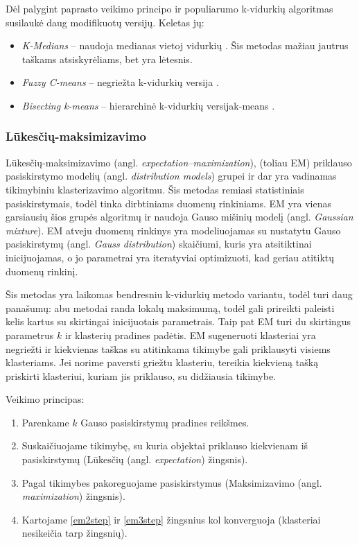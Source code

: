 \documentclass{VUMIFInfKursinis}
\newcommand{\ltang}[2]{#1 (angl. \textit{#2})}
\begin{document}

Dėl palygint paprasto veikimo principo ir populiarumo k-vidurkių
algoritmas susilaukė daug modifikuotų versijų. Keletas jų:

\begin{itemize}

\item
  \textit{K-Medians} – naudoja medianas vietoj vidurkių \cite{jain1988algorithms}. Šis metodas
  mažiau jautrus taškams atsiskyrėliams, bet yra lėtesnis.
\item
  \textit{Fuzzy C-means} – negriežta k-vidurkių versija \cite{dunn1973fuzzy}.
\item
  \textit{Bisecting k-means} – hierarchinė k-vidurkių versijak-means \cite{steinbach2000comparison} .
\end{itemize}






\subsubsection{Lūkesčių-maksimizavimo}

\ltang{Lūkesčių-maksimizavimo}{expectation–maximization},
(toliau EM) priklauso
\ltang{pasiskirstymo modelių}{distribution models}   grupei
ir dar yra vadinamas tikimybiniu klasterizavimo algoritmu.
Šis metodas
remiasi statistiniais pasiskirstymais,
todėl tinka dirbtiniams duomenų rinkiniams.
EM yra vienas garsiausių šios grupės algoritmų \cite{wu2008top} ir naudoja \ltang{Gauso mišinių modelį}{Gaussian mixture}. EM atveju duomenų
rinkinys yra modeliuojamas su nustatytu \ltang{Gauso pasiskirstymų}{Gauss distribution}  
skaičiumi, kuris yra atsitiktinai inicijuojamas, o jo parametrai yra
iteratyviai optimizuoti, kad geriau atitiktų duomenų rinkinį.

Šis metodas yra laikomas bendresniu k-vidurkių metodo variantu, todėl
turi daug panašumų: abu metodai randa lokalų maksimumą, todėl gali
prireikti paleisti kelis kartus su skirtingai inicijuotais parametrais.
Taip pat EM turi du skirtingus parametrus $k$ ir klasterių pradines
padėtis. EM sugeneruoti klasteriai yra negriežti ir kiekvienas taškas su
atitinkama tikimybe gali priklausyti visiems klasteriams. Jei norime
paversti griežtu klasteriu, tereikia kiekvieną tašką priskirti
klasteriui, kuriam jis priklauso, su didžiausia tikimybe.

Veikimo principas:

\begin{enumerate}

\item
  Parenkame $k$ Gauso pasiskirstymų pradines reikšmes.
\item
  Suskaičiuojame tikimybę, su kuria objektai priklauso kiekvienam iš
  pasiskirstymų (\ltang{Lūkesčių}{expectation} žingsnis).\label{em2step}
\item
  Pagal tikimybes pakoreguojame pasiskirstymus (\ltang{Maksimizavimo}{maximization} žingsnis).\label{em3step}
\item
  Kartojame \ref{em2step} ir \ref{em3step} žingsnius kol konverguoja (klasteriai nesikeičia tarp
  žingsnių).
\end{enumerate}
\end{document}
